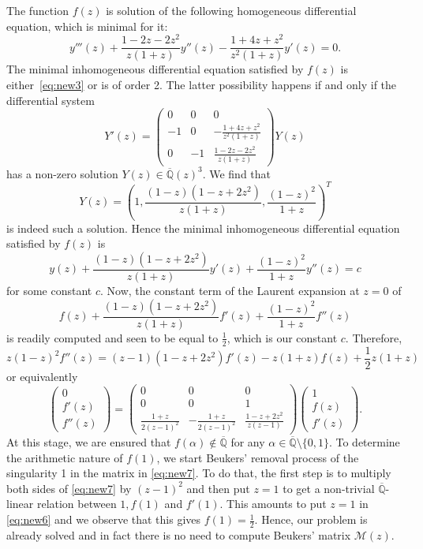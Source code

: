 \documentclass[reqno,english,12pt,a4paper]{smfart}
\numberwithin{equation}{section}
\def\Qbar{\overline{\mathbb Q}}
\begin{document}
The function $f(z)$ is solution of the following homogeneous differential equation, which is minimal for it: 
\begin{equation}\label{eq:new3}
y'''(z)+ \frac{1-2z-2z^2}{z(1+z)} y''(z)-\frac{1+4z+z^2}{z^2(1+z)} y'(z)=0.
\end{equation}
The minimal inhomogeneous differential equation satisfied by $f(z)$ is either~\eqref{eq:new3} or is of order 2. The latter possibility happens if and only if  the differential system
$$
Y'(z)=
\left(\begin{array}{ccc}
 0 & 0 & 0
\\
-1&0& -\frac{1+4z+z^2}{z^2(1+z)}
\\
0&-1& \frac{1-2z-2z^2}{z(1+z)}
\end{array} \right) Y(z)
$$
has a non-zero solution $Y(z)\in \Qbar(z)^3$. We find that 
$$
Y(z)= \left( 1, \frac{(1-z)(1-z+2z^2)}{z(1+z)}, \frac{(1-z)^2}{1+z} \right)^T
$$
is indeed such a solution. Hence the minimal inhomogeneous differential equation satisfied by $f(z)$ is 
\begin{equation*}
y(z)+\frac{(1-z)(1-z+2z^2)}{z(1+z)}y'(z)+\frac{(1-z)^2}{1+z} y''(z) =c
\end{equation*}
for some constant $c$. Now, the constant term of the Laurent expansion at $z=0$ of 
$$
f(z)+\frac{(1-z)(1-z+2z^2)}{z(1+z)}f'(z)+\frac{(1-z)^2}{1+z} f''(z)
$$
is readily computed and seen to be equal to $\frac12$, which is our constant $c$. 
Therefore,  
\begin{equation}\label{eq:new6}
z(1-z)^2f''(z)=(z-1)(1-z+2z^2)f'(z)-z(1+z)f(z)+\frac12 z(1+z)
\end{equation}
or equivalently
\begin{equation}\label{eq:new7}
\left(\begin{array}{c}0 \\ f'(z) \\ f''(z) \end{array} \right)
= \left(\begin{array}{ccc}
 0 & 0 & 0 
\\
0&0& 1
\\
\frac{1+z}{2(z-1)^2}& -\frac{1+z}{2(z-1)^2}&\frac{1-z+2z^2}{z(z-1)}
\end{array} \right)
\left(\begin{array}{c}1 \\ f(z) \\ f'(z) \end{array} \right).
\end{equation}
At this stage, we are ensured that $f(\alpha)\notin \Qbar$ for any $\alpha \in \Qbar \setminus \{0,1\}$. To determine the arithmetic nature of $f(1)$, we start Beukers' removal process of the singularity 1 in the matrix in \eqref{eq:new7}. To do that, the first step is to multiply both sides of \eqref{eq:new7} by $(z-1)^2$ and then put $z=1$ to get a non-trivial $\Qbar$-linear relation between $1, f(1)$ and $f'(1)$. This amounts to put 
$z=1$ in \eqref{eq:new6} and we observe that this gives $f(1)=\frac12$. Hence, our problem is already solved and in fact there 
is no need to compute Beukers' matrix $\mathcal{M}(z)$. 
\end{document}
